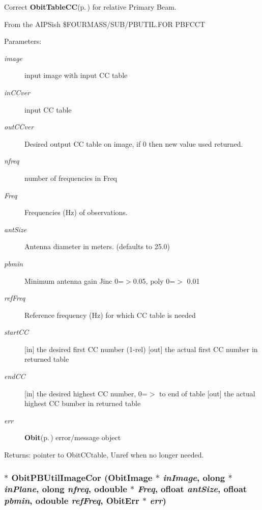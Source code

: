 Correct {\bf Obit\-Table\-CC}{\rm (p.\,\pageref{structObitTableCC})} for relative Primary Beam. 

From the AIPSish \$FOURMASS/SUB/PBUTIL.FOR PBFCCT \begin{Desc}
\item[Parameters:]
\begin{description}
\item[{\em image}]input image with input CC table \item[{\em in\-CCver}]input CC table \item[{\em out\-CCver}]Desired output CC table on image, if 0 then new value used returned. \item[{\em nfreq}]number of frequencies in Freq \item[{\em Freq}]Frequencies (Hz) of observations. \item[{\em ant\-Size}]Antenna diameter in meters. (defaults to 25.0) \item[{\em pbmin}]Minimum antenna gain Jinc 0=$>$0.05, poly 0=$>$ 0.01 \item[{\em ref\-Freq}]Reference frequency (Hz) for which CC table is needed \item[{\em start\-CC}][in] the desired first CC number (1-rel) [out] the actual first CC number in returned table \item[{\em end\-CC}][in] the desired highest CC number, 0=$>$ to end of table [out] the actual highest CC bumber in returned table \item[{\em err}]{\bf Obit}{\rm (p.\,\pageref{structObit})} error/message object \end{description}
\end{Desc}
\begin{Desc}
\item[Returns:]pointer to Obit\-CCtable, Unref when no longer needed. \end{Desc}
\subsubsection{$\ast$ Obit\-PBUtil\-Image\-Cor ({\bf Obit\-Image} $\ast$ {\em in\-Image}, {\bf olong} $\ast$ {\em in\-Plane}, {\bf olong} {\em nfreq}, {\bf odouble} $\ast$ {\em Freq}, {\bf ofloat} {\em ant\-Size}, {\bf ofloat} {\em pbmin}, {\bf odouble} {\em ref\-Freq}, {\bf Obit\-Err} $\ast$ {\em err})}\label{ObitPBUtil_8c_a5}


